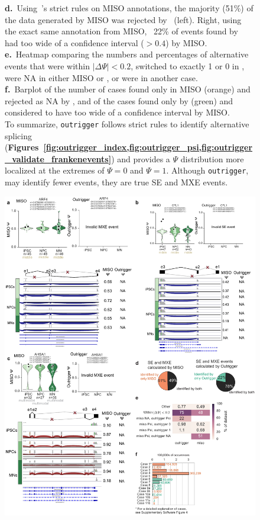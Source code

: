 \begin{figure}[h]
{\textbf{d.}~Using \outrigger\,'s strict rules on MISO annotations, the majority (51\%) of the data generated by MISO was rejected by \outrigger\, (left). Right, using the exact same annotation from MISO, \outrigger\, 22\% of events found by \outrigger\, had too wide of a confidence interval ($>0.4$) by MISO.\\
\textbf{e.}~Heatmap comparing the numbers and percentages of alternative events that were within $|\Delta\Psi| < 0.2$, switched to exactly 1 or 0 in \outrigger, were NA in either MISO or \outrigger, or were in another case.\\
\textbf{f.}~Barplot of the number of cases found only in MISO (orange) and rejected as NA by \outrigger, and of the cases found only by \outrigger (green) and considered to have too wide of a confidence interval by MISO.\\
To summarize, \texttt{outrigger} follows strict rules to identify alternative splicing (\textbf{Figures~\cref{fig:outrigger_index,fig:outrigger_psi,fig:outrigger_validate_frankenevents}}) and provides a $\Psi$ distribution more localized at the extremes of $\Psi = 0$ and $\Psi = 1$. Although \texttt{outrigger}, may identify fewer events, they are true SE and MXE events.}
\label{fig:miso}
\end{figure}
\clearpage
\begin{figure}[h]
\ContinuedFloat
\captionsetup{labelformat=empty}
\centering
\includegraphics[width=5.8in]{figures/invalid_miso.pdf}
\end{figure}
